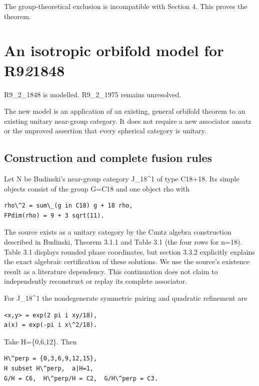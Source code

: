The group-theoretical exclusion is incompatible with Section 4. This
proves the theorem.

\hypertarget{an-isotropic-orbifold-model-for-r921848}{%
\section{\texorpdfstring{An isotropic orbifold model for
R9\emph{2}1848}{An isotropic orbifold model for R921848}}\label{an-isotropic-orbifold-model-for-r921848}}

R9\_2\_1848 is modelled. R9\_2\_1975 remains unresolved.

The new model is an application of an existing, general orbifold theorem
to an existing unitary near-group category. It does not require a new
associator ansatz or the unproved assertion that every spherical
category is unitary.

\hypertarget{construction-and-complete-fusion-rules}{%
\subsection{Construction and complete fusion
rules}\label{construction-and-complete-fusion-rules}}

Let N be Budinski's near-group category J\_18\^{}1 of type C18+18. Its
simple objects consist of the group G=C18 and one object rho with

\begin{verbatim}
rho\^2 = sum\_(g in C18) g + 18 rho,
FPdim(rho) = 9 + 3 sqrt(11).
\end{verbatim}

The source exists as a unitary category by the Cuntz algebra
construction described in Budinski, Theorem 3.1.1 and Table 3.1 (the
four rows for n=18). Table 3.1 displays rounded phase coordinates, but
section 3.3.2 explicitly explains the exact algebraic certification of
these solutions. We use the source's existence result as a literature
dependency. This continuation does not claim to independently
reconstruct or replay its complete associator.

For J\_18\^{}1 the nondegenerate symmetric pairing and quadratic
refinement are

\begin{verbatim}
<x,y> = exp(2 pi i xy/18),
a(x) = exp(-pi i x\^2/18).
\end{verbatim}

Take H=\{0,6,12\}. Then

\begin{verbatim}
H\^perp = {0,3,6,9,12,15},
H subset H\^perp,  a|H=1,
G/H = C6,  H\^perp/H = C2,  G/H\^perp = C3.
\end{verbatim}

